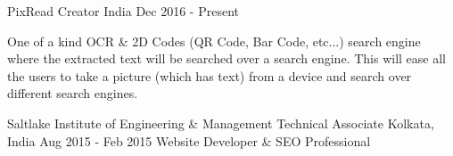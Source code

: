 \begin{cventries}
	\cventry
	{PixRead}
	{Creator}
	{India}
	{Dec 2016 - Present}
	{\begin{flushleft}
			One of a kind OCR \& 2D Codes (QR Code, Bar Code, etc...) search engine where the extracted text will
			be searched over a search engine. This will ease all the users to take a picture (which has text) from a
			device and search over different search engines.
		\end{flushleft}}

	\cventry
	{Saltlake Institute of Engineering \& Management}
	{Technical Associate}
	{Kolkata, India}
	{Aug 2015 - Feb 2015}
	{Website Developer \& SEO Professional}


\end{cventries}



